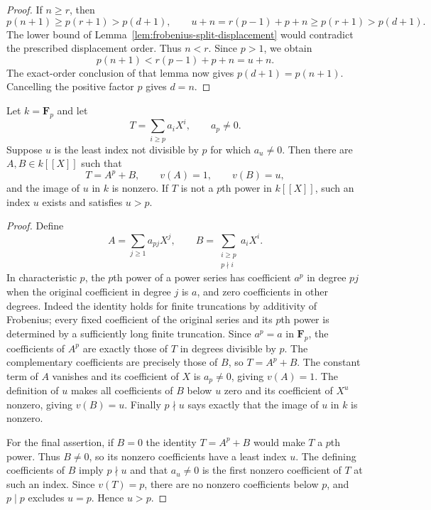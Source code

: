 \begin{proof}
If $n\ge r$, then
\[
 p(n+1)\ge p(r+1)>p(d+1),\qquad
 u+n=r(p-1)+p+n\ge p(r+1)>p(d+1).
\]
The lower bound of Lemma~\ref{lem:frobenius-split-displacement}
would contradict the prescribed displacement order. Thus $n<r$.
Since $p>1$, we obtain
\[
 p(n+1)<r(p-1)+p+n=u+n.
\]
The exact-order conclusion of that lemma now gives
$p(d+1)=p(n+1)$. Cancelling the positive factor $p$ gives $d=n$.
\end{proof}

\begin{lemma}
\label{lem:degree-p-parameter-frobenius-decomposition}
\leanok
Let $k=\mathbf F_p$ and let
\[
 T=\sum_{i\ge p}a_iX^i,\qquad a_p\ne0.
\]
Suppose $u$ is the least index not divisible by $p$ for which
$a_u\ne0$. Then there are $A,B\in k[[X]]$ such that
\[
 T=A^p+B,\qquad v(A)=1,\qquad v(B)=u,
\]
and the image of $u$ in $k$ is nonzero. If $T$ is not a $p$th
power in $k[[X]]$, such an index $u$ exists and satisfies $u>p$.
\end{lemma}

\begin{proof}
Define
\[
 A=\sum_{j\ge1}a_{pj}X^j,\qquad
 B=\sum_{\substack{i\ge p\\p\nmid i}}a_iX^i.
\]
In characteristic $p$, the $p$th power of a power series has
coefficient $a^p$ in degree $pj$ when the original coefficient
in degree $j$ is $a$, and zero coefficients in other degrees.
Indeed the identity holds for finite truncations by additivity
of Frobenius; every fixed coefficient of the original series and
its $p$th power is determined by a sufficiently long finite
truncation. Since $a^p=a$ in $\mathbf F_p$, the coefficients
of $A^p$ are exactly those of $T$ in degrees divisible by $p$.
The complementary coefficients are precisely those of $B$,
so $T=A^p+B$. The constant term of $A$ vanishes and its
coefficient of $X$ is $a_p\ne0$, giving $v(A)=1$.
The definition of $u$ makes all coefficients of $B$ below $u$
zero and its coefficient of $X^u$ nonzero, giving $v(B)=u$.
Finally $p\nmid u$ says exactly that the image of $u$ in $k$
is nonzero.

For the final assertion, if $B=0$ the identity $T=A^p+B$ would
make $T$ a $p$th power. Thus $B\ne0$, so its nonzero coefficients
have a least index $u$. The defining coefficients of $B$ imply
$p\nmid u$ and that $a_u\ne0$ is the first nonzero coefficient
of $T$ at such an index. Since $v(T)=p$, there are no nonzero
coefficients below $p$, and $p\mid p$ excludes $u=p$.
Hence $u>p$.
\end{proof}


